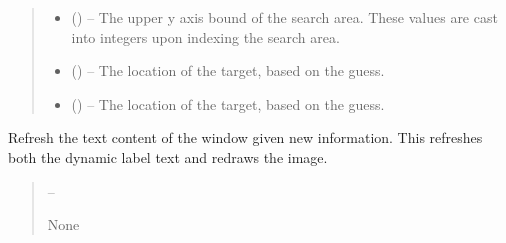 \documentclass[letterpaper,11pt,english]{sphinxmanual}
\begin{document}
\begin{savenotes}
\begin{fulllineitems}
\begin{savenotes}
\begin{fulllineitems}
\begin{quote}
\begin{description}
\begin{itemize}
\item {} 
\sphinxAtStartPar
{} () – The upper y axis bound of the search area. These values are cast
into integers upon indexing the search area.

\end{itemize}

\sphinxAtStartPar
\begin{itemize}
\item {} 
\sphinxAtStartPar
{} () – The location of the target, based on the guess.

\item {} 
\sphinxAtStartPar
{} () – The location of the target, based on the guess.

\end{itemize}


\end{description}\end{quote}

\end{fulllineitems}\end{savenotes}


\begin{savenotes}\begin{fulllineitems}
\label{\detokenize{code/opihiexarata.gui.selector:opihiexarata.gui.selector.TargetSelectorWindow.refresh_window}}
\pysigstartsignatures
{}
\pysigstopsignatures
\sphinxAtStartPar
Refresh the text content of the window given new information.
This refreshes both the dynamic label text and redraws the image.
\begin{quote}\begin{description}
\sphinxAtStartPar
{} – 

\sphinxAtStartPar
None

\end{description}\end{quote}

\end{fulllineitems}\end{savenotes}


\end{fulllineitems}
\end{savenotes}
\end{document}
